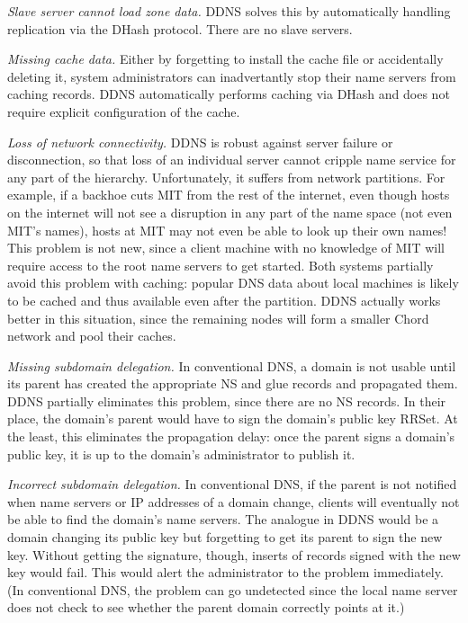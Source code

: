 {\em Slave server cannot load zone data.}
DDNS solves this by automatically handling replication 
via the DHash protocol.
There are no slave servers.

{\em Missing cache data.}
Either by forgetting to install the cache file or accidentally deleting it,
system administrators can inadvertantly stop their name servers
from caching records.
DDNS automatically performs caching via DHash and does
not require explicit configuration of the cache.

{\em Loss of network connectivity.}
DDNS is robust against server failure or disconnection, so that loss of
an individual server cannot cripple name service for any part of the
hierarchy. Unfortunately, it suffers from 
network partitions. For example, if a backhoe cuts MIT from 
the rest of the internet,
even though hosts on the internet will not see a disruption in any
part of the name space (not even MIT's names), hosts at MIT
may not even be able to look up their own names! 
This problem is not new, since a client machine with no 
knowledge of MIT will require access to the root name servers
to get started.
Both systems partially avoid this problem with caching:
popular DNS data about local machines is likely to be cached
and thus available even after the partition.
DDNS actually works better in this situation, since the remaining
nodes will form a smaller Chord network and pool their caches.
%

{\em Missing subdomain delegation.}
In conventional DNS, a domain is not usable until its parent
has created the appropriate NS and glue records and
propagated them.
DDNS partially eliminates this problem, since there are 
no NS records.
In their place, the domain's parent would have to sign the domain's
public key RRSet.
At the least, this eliminates the propagation delay: once the
parent signs a domain's public key, it is up to the domain's administrator
to publish it.

{\em Incorrect subdomain delegation.}
In conventional DNS, if the parent is not notified 
when name servers or IP addresses of a domain change,
clients will eventually not be able to find the domain's name servers.
The analogue in DDNS would be a domain changing its public
key but forgetting to get its parent to sign the new key.
Without getting the signature, though, inserts of records signed
with the new key would fail.  This would alert the administrator
to the problem immediately.  (In conventional DNS, the problem
can go undetected since the local name server does not check
to see whether the parent domain correctly points at it.)

